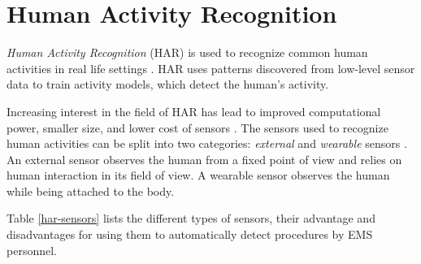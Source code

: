 \section{Human Activity Recognition}
\label{sec:Literature-Review:Human-Activity-Recognition}
\emph{Human Activity Recognition} (\gls{HAR}) is used to recognize common human activities in real life settings \cite{Helal2010}. HAR uses patterns discovered from low-level sensor data to train activity models, which detect the human's activity.
\par Increasing interest in the field of HAR has lead to improved computational power, smaller size, and lower cost of sensors \cite{Rodgers2015}. The sensors used to recognize human activities can be split into two categories: \emph{external} and \emph{wearable} sensors \cite{Lara2013}. An external sensor observes the human from a fixed point of view and relies on human interaction in its field of view. A wearable sensor observes the human while being attached to the body.
\par Table \ref{har-sensors} lists the different types of sensors, their advantage and disadvantages for using them to automatically detect procedures by EMS personnel.
